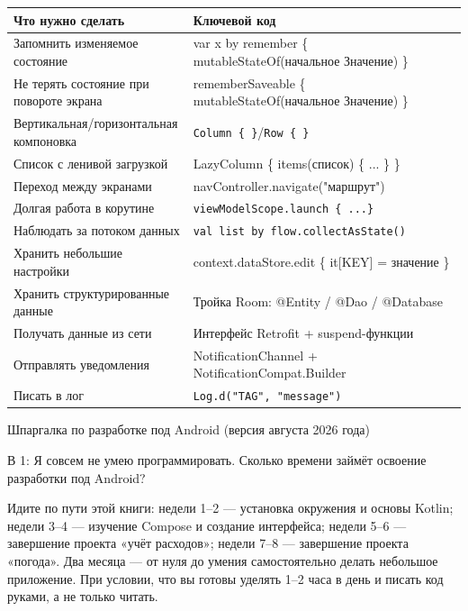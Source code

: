 


\begin{center}
\begin{tabularx}{\linewidth}{|X|X|}
\hline
\textbf{Что нужно сделать} & \textbf{Ключевой код} \tabularnewline
\hline
Запомнить изменяемое состояние & var x by remember \{ mutableStateOf(начальное Значение) \} \tabularnewline
Не терять состояние при повороте экрана & rememberSaveable \{ mutableStateOf(начальное Значение) \} \tabularnewline
Вертикальная/горизонтальная компоновка & \texttt{Column \{ \}}/\texttt{Row \{ \}} \tabularnewline
Список с ленивой загрузкой & LazyColumn \{ items(список) \{ ... \} \} \tabularnewline
Переход между экранами & navController.navigate("маршрут") \tabularnewline
Долгая работа в корутине & \texttt{viewModelScope.\allowbreak launch \{ .\allowbreak .\allowbreak .\allowbreak  \}} \tabularnewline
Наблюдать за потоком данных & \texttt{val list by flow.\allowbreak collectAsState()} \tabularnewline
Хранить небольшие настройки & context.dataStore.edit \{ it[KEY] = значение \} \tabularnewline
Хранить структурированные данные & Тройка Room: @Entity / @Dao / @Database \tabularnewline
Получать данные из сети & Интерфейс Retrofit + suspend-функции \tabularnewline
Отправлять уведомления & NotificationChannel + NotificationCompat.Builder \tabularnewline
Писать в лог & \texttt{Log.\allowbreak d("TAG", "message")} \tabularnewline
\hline
\end{tabularx}
\end{center}

\begin{center}\small\color{gray}Шпаргалка по разработке под Android (версия августа 2026 года)\end{center}


В 1: Я совсем не умею программировать. Сколько времени займёт освоение разработки под Android?

Идите по пути этой книги: недели 1–2 — установка окружения и основы Kotlin; недели 3–4 — изучение Compose и создание интерфейса; недели 5–6 — завершение проекта «учёт расходов»; недели 7–8 — завершение проекта «погода». Два месяца — от нуля до умения самостоятельно делать небольшое приложение. При условии, что вы готовы уделять 1–2 часа в день и писать код руками, а не только читать.

